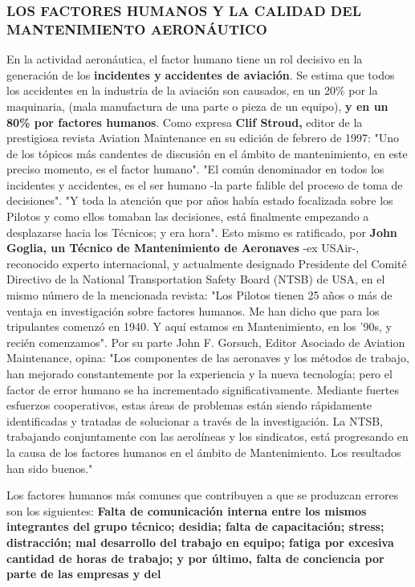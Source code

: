 \subsubsection*{LOS FACTORES HUMANOS Y LA CALIDAD DEL MANTENIMIENTO AERONÁUTICO}
En la actividad aeronáutica, el factor humano tiene un rol decisivo en la generación de los \textbf{incidentes y} \textbf{accidentes de aviación}. Se estima que todos los accidentes en la industria de la aviación son causados, en un 20\% por la maquinaria, (mala manufactura de una parte o pieza de un equipo), \textbf{y en un} \textbf{80\% por factores humanos}. Como expresa \textbf{Clif Stroud, }editor de la prestigiosa revista Aviation Maintenance en su edición de febrero de 1997: "Uno de los tópicos más candentes de discusión en el ámbito de mantenimiento, en este preciso momento, es el factor humano". "El común denominador en todos los incidentes y accidentes, es el ser humano -la parte falible del proceso de toma de decisiones". "Y toda la atención que por años había estado focalizada sobre los Pilotos y como ellos tomaban las decisiones, está finalmente empezando a desplazarse hacia los Técnicos; y era hora". Esto mismo es ratificado, por \textbf{John Goglia, un Técnico de Mantenimiento de Aeronaves }-ex USAir-, reconocido experto internacional, y actualmente designado Presidente del Comité Directivo de la National Transportation Safety Board (NTSB) de USA, en el mismo número de la mencionada revista: "Los Pilotos tienen 25 años o más de ventaja en investigación sobre factores humanos. Me han dicho que para los tripulantes comenzó en 1940. Y aquí estamos en Mantenimiento, en los '90s, y recién comenzamos". Por su parte John F. Gorsuch, Editor Asociado de Aviation Maintenance, opina: "Los componentes de las aeronaves y los métodos de trabajo, han mejorado constantemente por la experiencia y la nueva tecnología; pero el factor de error humano se ha incrementado significativamente. Mediante fuertes esfuerzos cooperativos, estas áreas de problemas están siendo rápidamente identificadas y tratadas de solucionar a través de la investigación. La NTSB, trabajando conjuntamente con las aerolíneas y los sindicatos, está progresando en la causa de los factores humanos en el ámbito de Mantenimiento. Los resultados han sido buenos."

Los factores humanos más comunes que contribuyen a que se produzcan errores son los siguientes: \textbf{Falta de comunicación interna entre los mismos integrantes del grupo técnico; desidia; falta de} \textbf{capacitación; stress; distracción; mal desarrollo del trabajo en equipo; fatiga por excesiva} \textbf{cantidad de horas de trabajo; y por último, falta de conciencia por parte de las empresas y del}


